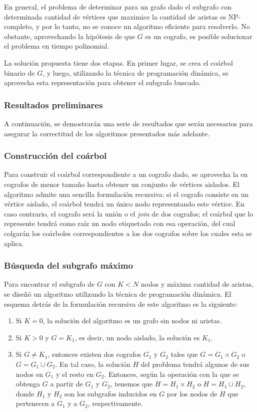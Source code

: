 En general, el problema de determinar para un grafo dado el subgrafo con
determinada cantidad de vértices que maximice la cantidad de aristas es
NP-completo, y por lo tanto, no se conoce un algoritmo eficiente para
resolverlo. No obstante, aprovechando la hipótesis de que $G$ es un cografo,
es posible solucionar el problema en tiempo polinomial.

La solución propuesta tiene dos etapas. En primer lugar, se crea el coárbol
binario de $G$, y luego, utilizando la técnica de programación dinámica, se
aprovecha esta representación para obtener el subgrafo buscado.

\subsubsection{Resultados preliminares}
A continuación, se demostrarán una serie de resultados que serán necesarios
para asegurar la correctitud de los algoritmos presentados más adelante.

\subsubsection{Construcción del coárbol}
Para construir el coárbol correspondiente a un cografo dado, se aprovecha la
en cografos de menor tamaño hasta obtener un conjunto de vértices aislados.
El algoritmo admite una sencilla formulación recursiva: si el cografo consiste
en un vértice aislado, el coárbol tendrá un único nodo representando este
vértice. En caso contrario, el cografo será la unión o el \emph{join} de dos
cografos; el coárbol que lo represente tendrá como raíz un nodo etiquetado con
esa operación, del cual colgarán los coárboles correspondientes a los dos
cografos sobre los cuales esta se aplica.

\subsubsection{Búsqueda del subgrafo máximo}
Para encontrar el subgrafo de $G$ con $K < N$ nodos y máxima cantidad de
aristas, se diseñó un algoritmo utilizando la técnica de programación
dinámica. El esquema detrás de la formulación recursiva de este algoritmo es
la siguiente:

\begin{enumerate}
    \item Si $K = 0$, la solución del algoritmo es un grafo sin nodos ni
    aristas.
    \item Si $K > 0$ y $G = K_1$, es decir, un nodo aislado, la solución es
    $K_1$.
    \item Si $G \neq K_1$, entonces existen dos cografos $G_1$ y $G_2$ tales
    que $G = G_1 \times G_2$ o $G = G_1 \cup G_2$. En tal caso, la solución
    $H$ del problema tendrá algunos de sus nodos en $G_1$ y el resto en $G_2$.
    Entonces, según la operación con la que se obtenga $G$ a partir de $G_1$ y
    $G_2$, tenemos que $H = H_1 \times H_2$ o $H = H_1 \cup H_2$, donde
    $H_1$ y $H_2$ son los subgrafos inducidos en $G$ por los nodos de $H$ que
    pertenecen a $G_1$ y a $G_2$, respectivamente.
\end{enumerate}

